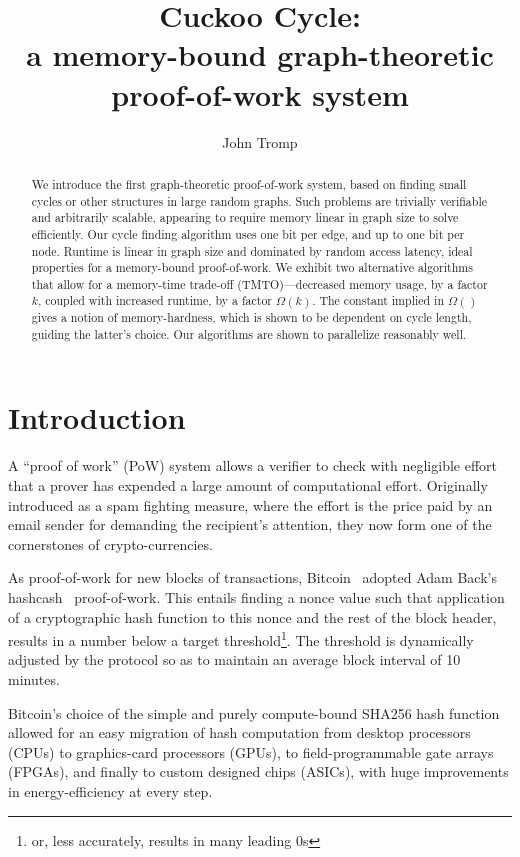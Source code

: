 \documentclass[11pt, oneside]{article}
\title{Cuckoo Cycle: \protect\\ a memory-bound graph-theoretic proof-of-work system}
\author{John Tromp}
\begin{document}
\maketitle

\begin{abstract}
We introduce the first graph-theoretic proof-of-work system,
based on finding small cycles or other structures in large random graphs.
Such problems are trivially verifiable and arbitrarily scalable, 
appearing to require memory linear in graph size to solve efficiently.
Our cycle finding algorithm uses one bit per edge, and up to one bit per node.
Runtime is linear in graph size and dominated by random access latency,
ideal properties for a memory-bound proof-of-work.
We exhibit two alternative algorithms that allow for a memory-time trade-off
(TMTO)---decreased memory usage, by a factor $k$, coupled with increased runtime, by a factor $\Omega(k)$.
The constant implied in $\Omega()$ gives a notion of memory-hardness, which is shown to be dependent
on cycle length, guiding the latter's choice. Our algorithms are shown to parallelize reasonably well.
\end{abstract}

\section{Introduction}
A ``proof of work'' (PoW) system allows a verifier to check with negligible
effort that a prover has expended a large amount of computational effort.
Originally introduced as a spam fighting measure, 
where the effort is the price paid by an email sender for demanding the
recipient's attention, they now form one of the cornerstones of crypto-currencies.

As proof-of-work for new blocks of transactions,
Bitcoin~\cite{nakamoto2009bitcoin} adopted Adam Back's hashcash~\cite{back2002} proof-of-work.
This entails finding a nonce value such that application of a cryptographic hash function
to this nonce and the rest of the block header, results in a number below a
target threshold\footnote{or, less accurately, results in many leading 0s}.
The threshold is dynamically adjusted by the protocol
so as to maintain an average block interval of 10 minutes.

Bitcoin's choice of the simple and purely compute-bound SHA256 hash function
allowed for an easy migration of hash computation from 
desktop processors (CPUs) to graphics-card processors (GPUs),
to field-programmable gate arrays (FPGAs), and finally to custom designed
chips (ASICs), with huge improvements in energy-efficiency at every step.
\end{document}
